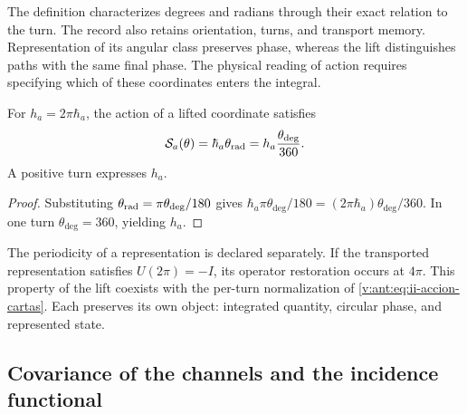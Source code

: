 The definition characterizes degrees and radians through their exact relation
to the turn. The record also retains orientation, turns, and
transport memory. Representation of its angular class preserves
phase, whereas the lift distinguishes paths with the same
final phase. The physical reading of action requires specifying which of
these coordinates enters the integral.

\begin{proposition}
For \(h_a=2\pi\hbar_a\), the action of a lifted coordinate
satisfies
\begin{equation}
 \mathcal S_a(\theta)
 =\hbar_a\theta_{\rm rad}
 =h_a\frac{\theta_{\deg}}{360}.
 \label{v:ant:eq:ii-accion-cartas}
\end{equation}
A positive turn expresses \(h_a\).
\end{proposition}
\begin{proof}
Substituting \(\theta_{\rm rad}=\pi\theta_{\deg}/180\) gives
\(\hbar_a\pi\theta_{\deg}/180
=(2\pi\hbar_a)\theta_{\deg}/360\). In one turn
\(\theta_{\deg}=360\), yielding \(h_a\).
\end{proof}

The periodicity of a representation is declared separately. If the
transported representation satisfies \(U(2\pi)=-I\), its operator
restoration occurs at \(4\pi\). This property of the lift
coexists with the per-turn normalization of
\eqref{v:ant:eq:ii-accion-cartas}. Each preserves its own object: integrated
quantity, circular phase, and represented state.

\subsection{Covariance of the channels and the incidence functional}

